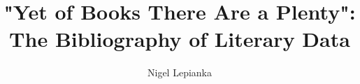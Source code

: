 \documentclass[ChapterMethod, ListStyleI]{TAMUthesis}
\title{"Yet of Books There Are a Plenty": The Bibliography of Literary Data}
\author{Nigel Lepianka}
\numberwithin{equation}{chapter}
\begin{document}
\maketitle



\frontmatter






\TAMUTableofContentsFormat	


	\tableofcontents
	


	

		
\TAMUListOfFiguresFormat

	\listoffigures

	



\TAMUListOfTablesFormat
    \listoftables


\mainmatter
	
	
	
	

		
\TAMUReferenceFormat
	\printbibliography[]
	
\appendix
\TAMUAppendixFormat		
\begin{appendices}

	
	
\end{appendices}
\end{document}
